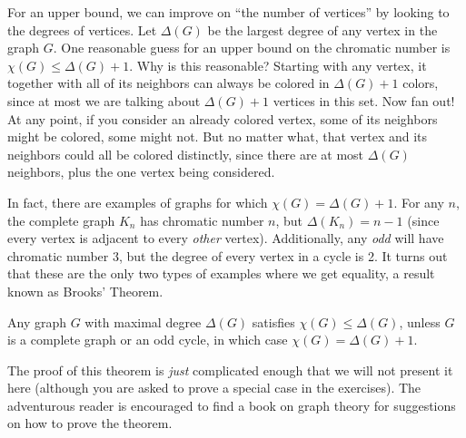 \documentclass[12pt]{article}
\begin{document}
For an upper bound, we can improve on ``the number of vertices'' by looking to the degrees of vertices.  Let $\Delta(G)$ be the largest degree of any vertex in the graph $G$.  One reasonable guess for an upper bound on the chromatic number is $\chi(G) \le \Delta(G) + 1$.  Why is this reasonable?  Starting with any vertex, it together with all of its neighbors can always be colored in $\Delta(G) + 1$ colors, since at most we are talking about $\Delta(G) + 1$ vertices in this set.  Now fan out!  At any point, if you consider an already colored vertex, some of its neighbors might be colored, some might not.  But no matter what, that vertex and its neighbors could all be colored distinctly, since there are at most $\Delta(G)$ neighbors, plus the one vertex being considered.

In fact, there are examples of graphs for which $\chi(G) = \Delta(G) + 1$.  For any $n$, the complete graph $K_n$ has chromatic number $n$, but $\Delta(K_n) = n-1$ (since every vertex is adjacent to every \emph{other} vertex).  Additionally, any \emph{odd} will have chromatic number 3, but the degree of every vertex in a cycle is 2.  It turns out that these are the only two types of examples where we get equality, a result known as Brooks' Theorem.

\begin{theorem}
Any graph $G$ with maximal degree $\Delta(G)$ satisfies $\chi(G) \le \Delta(G)$, unless $G$ is a complete graph or an odd cycle, in which case $\chi(G) = \Delta(G) + 1$.
\end{theorem}

The proof of this theorem is \emph{just} complicated enough that we will not present it here (although you are asked to prove a special case in the exercises).  The adventurous reader is encouraged to find a book on graph theory for suggestions on how to prove the theorem.
\end{document}
